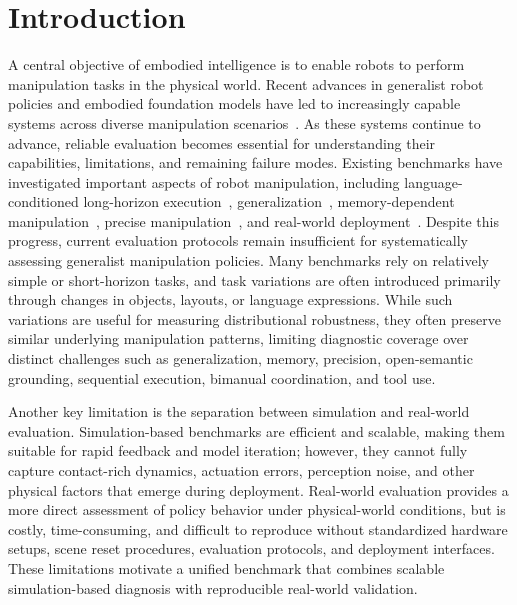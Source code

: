 \section{Introduction}
\label{sec:introduction}

A central objective of embodied intelligence is to enable robots to perform manipulation tasks in the physical world. Recent advances in generalist robot policies and embodied foundation models have led to increasingly capable systems across diverse manipulation scenarios~\citep{intelligence2026pi,zhang2026joyaira01foundationmodel,li2026causalworldmodelingrobot,li2025simplevla,zhang2026hy,lyu2026lda,yuan2026qwen}. As these systems continue to advance, reliable evaluation becomes essential for understanding their capabilities, limitations, and remaining failure modes. Existing benchmarks have investigated important aspects of robot manipulation, including language-conditioned long-horizon execution~\citep{mees2022calvin}, generalization~\citep{chen2025robotwin}, memory-dependent manipulation~\citep{chen2026rmbench}, precise manipulation~\citep{chen2026univtac,lan2025autobio}, and real-world deployment~\citep{yakefu2025robochallenge,chen2026manipulationnet,atreya2025roboarena}. Despite this progress, current evaluation protocols remain insufficient for systematically assessing generalist manipulation policies. Many benchmarks rely on relatively simple or short-horizon tasks, and task variations are often introduced primarily through changes in objects, layouts, or language expressions. While such variations are useful for measuring distributional robustness, they often preserve similar underlying manipulation patterns, limiting diagnostic coverage over distinct challenges such as generalization, memory, precision, open-semantic grounding, sequential execution, bimanual coordination, and tool use.

Another key limitation is the separation between simulation and real-world evaluation. Simulation-based benchmarks are efficient and scalable, making them suitable for rapid feedback and model iteration; however, they cannot fully capture contact-rich dynamics, actuation errors, perception noise, and other physical factors that emerge during deployment. Real-world evaluation provides a more direct assessment of policy behavior under physical-world conditions, but is costly, time-consuming, and difficult to reproduce without standardized hardware setups, scene reset procedures, evaluation protocols, and deployment interfaces. These limitations motivate a unified benchmark that combines scalable simulation-based diagnosis with reproducible real-world validation.

